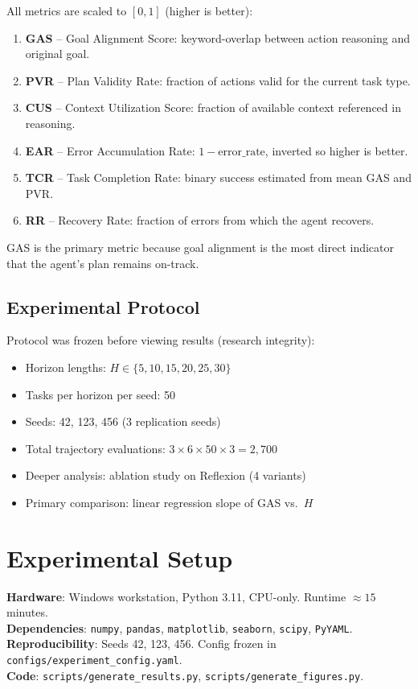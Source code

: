 \documentclass[conference]{IEEEtran}
\begin{document}
All metrics are scaled to $[0,1]$ (higher is better):
\begin{enumerate}
  \item \textbf{GAS} -- Goal Alignment Score: keyword-overlap between action
        reasoning and original goal.
  \item \textbf{PVR} -- Plan Validity Rate: fraction of actions valid for the
        current task type.
  \item \textbf{CUS} -- Context Utilization Score: fraction of available
        context referenced in reasoning.
  \item \textbf{EAR} -- Error Accumulation Rate: $1-\text{error\_rate}$,
        inverted so higher is better.
  \item \textbf{TCR} -- Task Completion Rate: binary success estimated from
        mean GAS and PVR.
  \item \textbf{RR} -- Recovery Rate: fraction of errors from which the agent
        recovers.
\end{enumerate}

GAS is the primary metric because goal alignment is the most direct indicator
that the agent's plan remains on-track.

\subsection{Experimental Protocol}

Protocol was frozen before viewing results (research integrity):
\begin{itemize}
  \item Horizon lengths: $H\in\{5,10,15,20,25,30\}$
  \item Tasks per horizon per seed: 50
  \item Seeds: 42, 123, 456 (3 replication seeds)
  \item Total trajectory evaluations: $3\times6\times50\times3=2{,}700$
  \item Deeper analysis: ablation study on Reflexion (4 variants)
  \item Primary comparison: linear regression slope of GAS vs.\ $H$
\end{itemize}

\section{Experimental Setup}

\textbf{Hardware}: Windows workstation, Python 3.11, CPU-only. Runtime
$\approx\!15$ minutes.\\
\textbf{Dependencies}: \texttt{numpy}, \texttt{pandas}, \texttt{matplotlib},
\texttt{seaborn}, \texttt{scipy}, \texttt{PyYAML}.\\
\textbf{Reproducibility}: Seeds 42, 123, 456. Config frozen in
\texttt{configs/experiment\_config.yaml}.\\
\textbf{Code}: \texttt{scripts/generate\_results.py},
\texttt{scripts/generate\_figures.py}.
\end{document}
